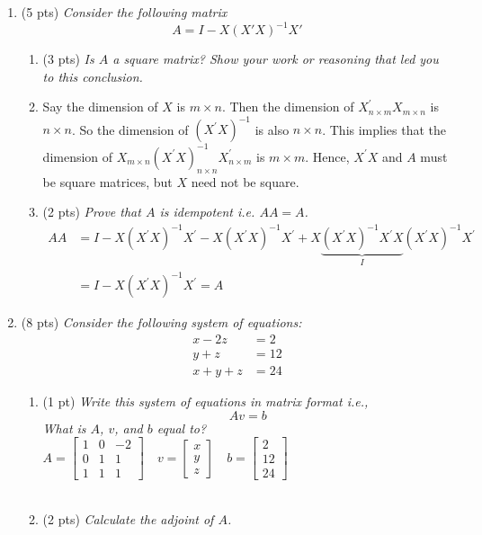 \documentclass{./../../../Latex/tests}
\begin{document}
\begin{enumerate}
\newpage
\item (5 pts) \textit{Consider the following matrix $$A = I - X(X'X)^{-1}X'$$}
\begin{enumerate}
\item (3 pts)  \textit{Is $A$ a square matrix? Show your work or reasoning that led you to this conclusion.}
\item[] Say the dimension of $X$ is \( m \times n \). Then the dimension of \( X_{n \times m}^{\prime} X_{m \times n} \) is \( n \times n \). So the dimension of \( \left(X^{\prime} X\right)^{-1} \) is also  \( n \times n \).  This implies that the dimension of \( X_{m \times n}\left(X^{\prime} X\right)_{n \times n}^{-1} X_{n \times m}^{\prime} \) is \( m \times m \). Hence, \( X^{\prime} X \) and $A$ must be square matrices, but $X$ need not be square. \\
\item (2 pts) \textit{Prove that $A$ is idempotent i.e. $A A = A$.} 
$$
\begin{aligned}
A A &=I-X\left(X^{\prime} X\right)^{-1} X^{\prime}-X\left(X^{\prime} X\right)^{-1} X^{\prime}+X\underbrace{\left(X^{\prime} X\right)^{-1} X^{\prime} X}_{I}\left(X^{\prime} X\right)^{-1} X^{\prime} \\
&=I-X\left(X^{\prime} X\right)^{-1} X^{\prime} = A
\end{aligned}
$$
\end{enumerate} 

\vspace{1cm}

\item (8 pts) \textit{Consider the following system of equations:
}\begin{align*}
x-2z & = 2 \\
y+z & = 12 \\
x+y+z &= 24	
\end{align*}
\begin{enumerate}
  \item (1 pt) \textit{Write this system of equations in matrix format i.e., $$ Av=b $$
  What is $A$, $v$, and $b$ equal to?} \\
  
  $A=\left[\begin{array}{rrr}1 & 0 & -2 \\ 0 & 1 & 1 \\ 1 & 1 & 1\end{array}\right] \quad v=\left[\begin{array}{l}x \\ y \\ z\end{array}\right] \quad b=\left[\begin{array}{c}2 \\ 12 \\ 24\end{array}\right]$ \\~\\
   \item (2 pts) \textit{Calculate the adjoint of $A$. } \\
   

\end{enumerate}
\end{enumerate}
\end{document}
